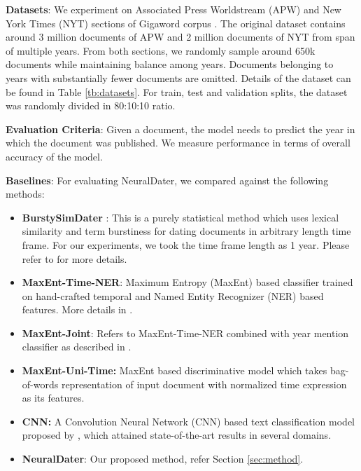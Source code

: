 \documentclass[11pt,a4paper]{article}
\newcommand{\method}{NeuralDater}
\begin{document}
\textbf{Datasets}: We experiment on Associated Press Worldstream (APW) and New York Times (NYT) sections of Gigaword corpus \cite{gigaword5th}. The original dataset contains around 3 million documents of APW and 2 million documents of NYT from span of multiple years. From both sections, we randomly sample around 650k documents while maintaining balance among years. Documents belonging to years with substantially fewer documents are omitted. Details of the dataset can be found in Table \ref{tb:datasets}. For train, test and validation  splits, the dataset was randomly divided in 80:10:10 ratio.

\textbf{Evaluation Criteria}: Given a document, the model needs to predict the year in which the document was published. We measure performance in terms of overall accuracy of the model. 

\textbf{Baselines}: For evaluating \method{}, we compared against the following methods:

\begin{itemize}
	\item \textbf{BurstySimDater} \citet{Kotsakos:2014:BAD:2600428.2609495}:  This is a purely statistical method which uses lexical similarity and term burstiness \cite{Lappas:2009:BSD:1557019.1557075} for dating documents in arbitrary length time frame. For our experiments, we took the time frame length as 1 year. Please refer to \cite{Kotsakos:2014:BAD:2600428.2609495} for more details.
	\item \textbf{MaxEnt-Time-NER}: Maximum Entropy (MaxEnt) based classifier trained on hand-crafted temporal and Named Entity Recognizer (NER) based features. More details in \cite{Chambers:2012:LDT:2390524.2390539}. 
	\item \textbf{MaxEnt-Joint}: Refers to MaxEnt-Time-NER combined with year mention classifier as described in \cite{Chambers:2012:LDT:2390524.2390539}. 
	\item \textbf{MaxEnt-Uni-Time:} MaxEnt based discriminative model which takes bag-of-words representation of input document with normalized time expression as its features. 
	\item \textbf{CNN:} A Convolution Neural Network (CNN) \cite{cnn_paper} based text classification model proposed by \cite{yoon_kim}, which attained state-of-the-art results in several domains. 
	\item {\bf {\method{}}}: Our proposed method, refer Section \ref{sec:method}.
\end{itemize}
\end{document}
